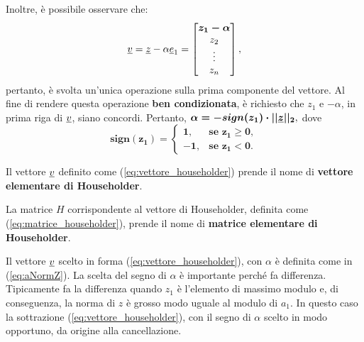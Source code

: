 \addtocounter{footnote}{-1}


Inoltre, è possibile osservare che:
\begin{equation*}
    \uline v= \uline z -\alpha\uline e_1 = 
    \begin{bmatrix}
        \boldsymbol{z_1 - \alpha}\\
        z_2\\
        \vdots\\
        z_n
    \end{bmatrix},
\end{equation*}
pertanto, è svolta un'unica operazione sulla prima componente del vettore. Al fine di rendere questa operazione \textbf{ben condizionata}, è richiesto che $z_1$ e $-\alpha$, in prima riga di $\uline v$, siano concordi. Pertanto, $\boldsymbol{\alpha=-sign(z_1)\cdot||\uline z||_2},$ dove
\begin{equation*}
    \boldsymbol{sign(z_1)=
    \begin{cases}
        1, &\text{se } z_1\geq 0,\\
        -1, & \text{se } z_1<0.
    \end{cases}}
\end{equation*}

\begin{definition}
    Il vettore $\uline v$ definito come (\ref{eq:vettore_householder}) prende il nome di \textbf{vettore elementare di Householder}. 
\end{definition}

\begin{definition}
	La matrice $H$ corrispondente al vettore di Householder, definita come (\ref{eq:matrice_householder}), prende il nome di \textbf{matrice elementare di Householder}.
\end{definition}

Il vettore $\uline v$ scelto in forma (\ref{eq:vettore_householder}), con $\alpha$ è definita come in (\ref{eq:aNormZ}). La scelta del segno di $\alpha$ è importante perché fa differenza. Tipicamente fa la differenza quando $z_1$ è l'elemento di massimo modulo e, di conseguenza, la norma di $z$ è grosso modo uguale al modulo di $a_1$. In questo caso la sottrazione (\ref{eq:vettore_householder}), con il segno di $\alpha$ scelto in modo opportuno, da origine alla cancellazione.

